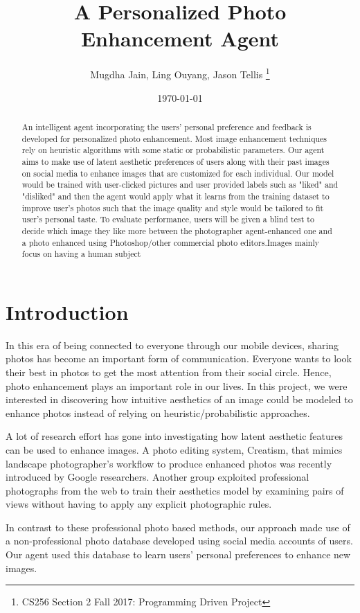 \documentclass[11pt, a4paper]{article}
\title{A Personalized Photo Enhancement Agent}
\author{Mugdha Jain, Ling Ouyang, Jason Tellis
\thanks{CS256 Section 2 Fall 2017: Programming Driven Project}}
\date{\today}
\begin{document}
\maketitle

\begin{abstract}
An intelligent agent incorporating the users' personal preference and feedback is developed for personalized photo enhancement. Most image enhancement techniques rely on heuristic algorithms with some static or probabilistic parameters. Our agent aims to make use of latent aesthetic preferences of users along with their past images on social media to enhance images that are customized for each individual. Our model would be trained with user-clicked pictures and user provided labels such as "liked" and "disliked" and then the agent would apply what it learns from the training dataset to improve user's photos such that the image quality and style would be tailored to fit user's personal taste.     
To evaluate performance, users will be given a blind test to decide which image they like more between the photographer agent-enhanced one and a photo enhanced using Photoshop/other commercial photo editors.Images mainly focus on having a human subject\end{abstract}

\section{Introduction}
In this era of being connected to everyone through our mobile devices, sharing photos has become an important form of communication. Everyone wants to look their best in photos to get the most attention from their social circle. Hence, photo enhancement plays an important role in our lives. In this project, we were interested in discovering how intuitive aesthetics of an image could be modeled to enhance photos instead of relying on heuristic/probabilistic approaches.  

A lot of research effort has gone into investigating how latent aesthetic features can be used to enhance images. A photo editing system, Creatism, that mimics landscape photographer's workflow to produce enhanced photos \cite{DBLP:journals/corr/FangZ17} was recently introduced by Google researchers. Another group \cite{DBLP:journals/corr/ChenKSCM17}  exploited professional photographs from the web to train their aesthetics model by examining pairs of views without having to apply any explicit photographic rules. 

In contrast to these professional photo based methods, our approach made use of a non-professional photo database developed using social media accounts of users. Our agent used this database to learn users' personal preferences to enhance new images.
\end{document}
